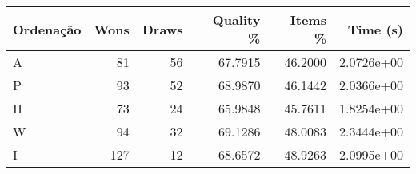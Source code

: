 \begin{tabular}{lrrrrr}
\hline
Ordenação & Wons & Draws & Quality \% & Items \% & Time (s)   \\
\hline
A         & 81   & 56    & 67.7915    & 46.2000  & 2.0726e+00 \\
P         & 93   & 52    & 68.9870    & 46.1442  & 2.0366e+00 \\
H         & 73   & 24    & 65.9848    & 45.7611  & 1.8254e+00 \\
W         & 94   & 32    & 69.1286    & 48.0083  & 2.3444e+00 \\
I         & 127  & 12    & 68.6572    & 48.9263  & 2.0995e+00 \\
\hline
\end{tabular}